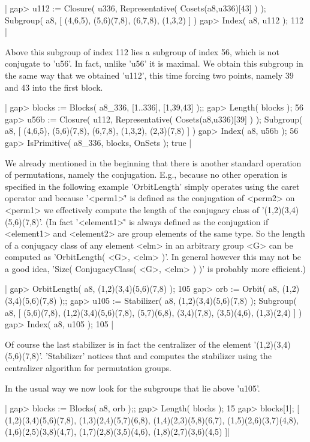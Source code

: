 |    gap> u112 := Closure( u336, Representative( Cosets(a8,u336)[43] ) );
    Subgroup( a8, [ (4,6,5), (5,6)(7,8), (6,7,8), (1,3,2) ] )
    gap> Index( a8, u112 );
    112 |

Above this subgroup of index 112 lies a  subgroup  of index 56, which  is
not conjugate to 'u56'.  In fact, unlike 'u56' it is  maximal.  We obtain
this subgroup in  the same way that we obtained 'u112', this time forcing
two points, namely 39 and 43 into the first block.

|    gap> blocks := Blocks( a8_336, [1..336], [1,39,43] );;
    gap> Length( blocks );
    56
    gap> u56b := Closure( u112, Representative( Cosets(a8,u336)[39] ) );
    Subgroup( a8, [ (4,6,5), (5,6)(7,8), (6,7,8), (1,3,2), (2,3)(7,8) ] )
    gap> Index( a8, u56b );
    56
    gap> IsPrimitive( a8_336, blocks, OnSets );
    true |

We already mentioned  in the beginning  that  there  is another  standard
operation of  permutations, namely  the  conjugation.   E.g., because  no
other operation  is  specified  in the  following  example  'OrbitLength'
simply  operates  using the caret operator and because '<perm1>\^<perm2>'
is defined  as the  conjugation  of <perm2>  on  <perm1>  we  effectively
compute the length of the conjugacy class of '(1,2)(3,4)(5,6)(7,8)'.  (In
fact  '<element1>\^<element2>'  is  always defined  as the conjugation if
<element1> and <element2> are group elements of  the  same  type.  So the
length of a conjugacy class  of any  element <elm>  in an arbitrary group
<G> can be computed as 'OrbitLength( <G>, <elm>  )'.  In general  however
this may not be a good  idea, 'Size( ConjugacyClass( <G>,  <elm> ) )'  is
probably more efficient.)

|    gap> OrbitLength( a8, (1,2)(3,4)(5,6)(7,8) );
    105
    gap> orb := Orbit( a8, (1,2)(3,4)(5,6)(7,8) );;
    gap> u105 := Stabilizer( a8, (1,2)(3,4)(5,6)(7,8) );
    Subgroup( a8, [ (5,6)(7,8), (1,2)(3,4)(5,6)(7,8), (5,7)(6,8),
      (3,4)(7,8), (3,5)(4,6), (1,3)(2,4) ] )
    gap> Index( a8, u105 );
    105 |

Of course the last stabilizer  is in  fact the centralizer of the element
'(1,2)(3,4)(5,6)(7,8)'.   'Stabilizer'  notices  that  and  computes  the
stabilizer using the centralizer algorithm for permutation groups.

In the usual way we now look for the subgroups that lie above 'u105'.

|    gap> blocks := Blocks( a8, orb );;
    gap> Length( blocks );
    15
    gap> blocks[1];
    [ (1,2)(3,4)(5,6)(7,8), (1,3)(2,4)(5,7)(6,8), (1,4)(2,3)(5,8)(6,7),
      (1,5)(2,6)(3,7)(4,8), (1,6)(2,5)(3,8)(4,7), (1,7)(2,8)(3,5)(4,6),
      (1,8)(2,7)(3,6)(4,5) ]|

